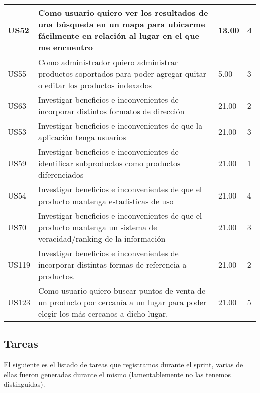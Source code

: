 \begin{tabular}{|p{1cm}|p{10cm}|p{1cm}|p{1cm}|}
\hline	
US52 &Como usuario quiero ver los resultados de una búsqueda en un mapa para ubicarme fácilmente en relación al lugar en el que me encuentro& 13.00&4\\ 
\hline
US55 &Como administrador quiero administrar productos soportados para poder agregar quitar o editar los productos indexados &5.00&3\\ 
\hline
US63 &Investigar beneficios e inconvenientes de incorporar distintos formatos de dirección &21.00&2\\ 
\hline
US53 &Investigar beneficios e inconvenientes de que la aplicación tenga usuarios& 21.00&3\\ 
\hline	
US59 &Investigar beneficios e inconvenientes de identificar subproductos como productos diferenciados &21.00&1\\ 
\hline		
US54 &Investigar beneficios e inconvenientes de que el producto mantenga estadísticas de uso &21.00&4\\ 
\hline	
US70 &Investigar beneficios e inconvenientes de que el producto mantenga un sistema de veracidad/ranking de la información &21.00&3\\ 	
\hline	
US119 &Investigar beneficios e inconvenientes de incorporar distintas formas de referencia a productos. &21.00&2\\ 
\hline		
US123 &Como usuario quiero buscar puntos de venta de un producto por cercanía a un lugar para poder elegir los más cercanos a dicho lugar. &21.00&5\\ 
\hline
\hline
\end{tabular}
\newpage

\subsection{Tareas}

El siguiente es el listado de tareas que registramos durante el sprint, varias de ellas fueron generadas durante el mismo (lamentablemente no las tenemos distinguidas).

